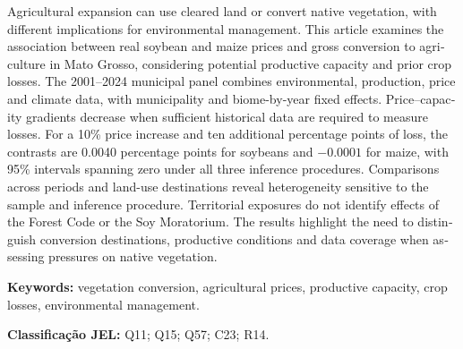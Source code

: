 \vspace{0.3cm}
\begin{otherlanguage}{english}
Agricultural expansion can use cleared land or convert native vegetation, with different implications for environmental management. This article examines the association between real soybean and maize prices and gross conversion to agriculture in Mato Grosso, considering potential productive capacity and prior crop losses. The 2001--2024 municipal panel combines environmental, production, price and climate data, with municipality and biome-by-year fixed effects. Price--capacity gradients decrease when sufficient historical data are required to measure losses. For a 10\% price increase and ten additional percentage points of loss, the contrasts are 0.0040 percentage points for soybeans and $-0.0001$ for maize, with 95\% intervals spanning zero under all three inference procedures. Comparisons across periods and land-use destinations reveal heterogeneity sensitive to the sample and inference procedure. Territorial exposures do not identify effects of the Forest Code or the Soy Moratorium. The results highlight the need to distinguish conversion destinations, productive conditions and data coverage when assessing pressures on native vegetation.

\vspace{0.4cm}
\noindent\textbf{Keywords:} vegetation conversion, agricultural prices, productive capacity, crop losses, environmental management.
\end{otherlanguage}

\vspace{0.4cm}
\noindent\textbf{Classificação JEL:} Q11; Q15; Q57; C23; R14.
